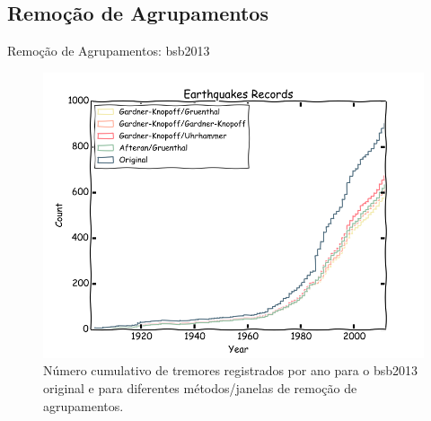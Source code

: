 \documentclass[ucs,8pt]{beamer}
\begin{document}
\subsection{Remoção de Agrupamentos}


\begin{frame}{Remoção de Agrupamentos: \gls{bsb2013}}
\begin{figure}[H]
	\centering
	\includegraphics[height=0.90\textheight]{decluster_br}
	\caption{Número cumulativo de tremores registrados por ano para o \gls{bsb2013}
	original e para diferentes métodos/janelas de remoção de agrupamentos.}
	\label{fig:br_eq_record}
\end{figure}
\end{frame}
\end{document}
